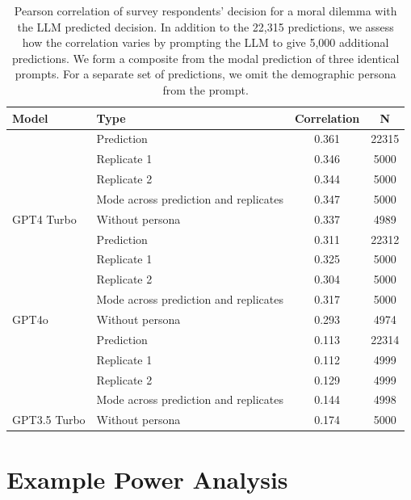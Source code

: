 \renewcommand{\arraystretch}{0.9}
\begin{table}[!h]
\centering
\begin{tabular}[t]{llcc}
\toprule
Model & Type & Correlation & N\\
\midrule
 & Prediction & 0.361 & 22315\\
\cmidrule{2-4}
 & Replicate 1 & 0.346 & 5000\\
\cmidrule{2-4}
 & Replicate 2 & 0.344 & 5000\\
\cmidrule{2-4}
 & Mode across prediction and replicates & 0.347 & 5000\\
\cmidrule{2-4}
\multirow{-5}{*}{\raggedright\arraybackslash GPT4 Turbo} & Without persona & 0.337 & 4989\\
\cmidrule{1-4}
 & Prediction & 0.311 & 22312\\
\cmidrule{2-4}
 & Replicate 1 & 0.325 & 5000\\
\cmidrule{2-4}
 & Replicate 2 & 0.304 & 5000\\
\cmidrule{2-4}
 & Mode across prediction and replicates & 0.317 & 5000\\
\cmidrule{2-4}
\multirow{-5}{*}{\raggedright\arraybackslash GPT4o} & Without persona & 0.293 & 4974\\
\cmidrule{1-4}
 & Prediction & 0.113 & 22314\\
\cmidrule{2-4}
 & Replicate 1 & 0.112 & 4999\\
\cmidrule{2-4}
 & Replicate 2 & 0.129 & 4999\\
\cmidrule{2-4}
 & Mode across prediction and replicates & 0.144 & 4998\\
\cmidrule{2-4}
\multirow{-5}{*}{\raggedright\arraybackslash GPT3.5 Turbo} & Without persona & 0.174 & 5000\\
\bottomrule
\end{tabular}
\caption{\label{tab:corr-tab}Pearson correlation of survey respondents' decision for a moral dilemma with the LLM predicted decision. In addition to the 22,315 predictions, we assess how the correlation varies by prompting the LLM to give 5,000 additional predictions. We form a composite from the modal prediction of three identical prompts. For a separate set of predictions, we omit the demographic persona from the prompt.}
\end{table}

\newpage 
\section{Example Power Analysis}\label{sec:gpower}

